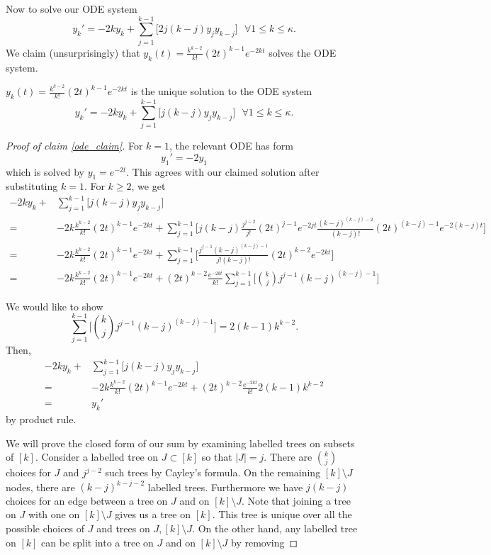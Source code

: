 Now to solve our ODE system
\[y_{k}' = -2 k y_{k} + \sum\limits_{j=1}^{k-1} \Big[ 2 j (k - j) y_{j}y_{k-j}\Big] \text{ } \forall 1 \leq k \leq \kappa. \]
We claim (unsurprisingly) that \(y_{k}(t) = \frac{k^{k-2}}{k!}(2t)^{k-1} e^{-2kt}\) solves the ODE system.
\begin{claim} 
    \label{ode_claim}
    \(y_{k}(t) = \frac{k^{k-2}}{k!}(2t)^{k-1} e^{-2kt}\) is the unique solution to the ODE system
    \[y_{k}' = -2 k y_{k} + \sum\limits_{j=1}^{k-1} \Big[ j (k - j) y_{j}y_{k-j}\Big] \text{ } \forall 1 \leq k \leq \kappa. \]
\end{claim}
\begin{proof}[Proof of claim \ref{ode_claim}]
    For \(k = 1\), the relevant ODE has form
    \[y_{1}' = -2 y_{1}\]
    which is solved by \(y_{1} = e^{-2t}\). This agrees with our claimed solution after substituting \(k=1\). For \(k \geq 2\), we get
    \begin{align*}
        -2 k y_{k} + &\sum\limits_{j=1}^{k-1} \Big[ j (k - j) y_{j}y_{k-j}\Big] \\
        = &-2 k \frac{k^{k-2}}{k!}(2t)^{k-1} e^{-2kt} + \sum\limits_{j=1}^{k-1} \Big[ j (k - j) \frac{j^{j-2}}{j!}(2t)^{j-1} e^{-2jt} \frac{(k-j)^{(k-j)-2}}{(k-j)!}(2t)^{(k-j)-1} e^{-2(k-j)t}\Big] \\
        = &-2 k \frac{k^{k-2}}{k!}(2t)^{k-1} e^{-2kt} + \sum\limits_{j=1}^{k-1} \Big[  \frac{j^{j-1}(k-j)^{(k-j)-1} }{j!(k-j)!}(2t)^{k-2} e^{-2kt}\Big] \\
        = &-2 k \frac{k^{k-2}}{k!}(2t)^{k-1} e^{-2kt} + (2t)^{k-2} \frac{e^{-2kt}}{k!} \sum\limits_{j=1}^{k-1} \Big[ \binom{k}{j} j^{j-1}(k-j)^{(k-j)-1}\Big]
    \end{align*}

    We would like to show
    \[\sum\limits_{j=1}^{k-1} \Big[ \binom{k}{j} j^{j-1}(k-j)^{(k-j)-1}\Big] = 2(k-1)k^{k-2}.\]
    Then,
    \begin{align*}
        -2 k y_{k} + &\sum\limits_{j=1}^{k-1} \Big[ j (k - j) y_{j}y_{k-j}\Big] \\
        = &-2 k \frac{k^{k-2}}{k!}(2t)^{k-1} e^{-2kt} + (2t)^{k-2} \frac{e^{-2kt}}{k!} 2(k-1)k^{k-2} \\
        =& y_{k}'
    \end{align*}
    by product rule.

    We will prove the closed form of our sum by examining labelled trees on subsets of \([k]\). Consider a labelled tree on \(J \subset [k]\) so that \(|J| = j\). There are \(\binom{k}{j}\) choices for \(J\) and \(j^{j-2}\) such trees by Cayley's formula. On the remaining \([k] \setminus J\) nodes, there are \((k-j)^{k-j-2}\) labelled trees. Furthermore we have \(j(k-j)\) choices for an edge between a tree on \(J\) and on \([k] \setminus J\). Note that joining a tree on \(J\) with one on \([k] \setminus J\) gives us a tree on \([k]\). This tree is unique over all the possible choices of \(J\) and trees on \(J, [k] \setminus J\).   On the other hand, any labelled tree on \([k]\) can be split into a tree on \(J\) and on \([k] \setminus J\) by removing 
\end{proof}



